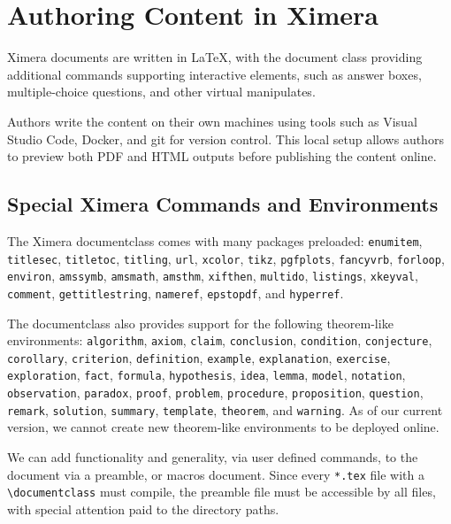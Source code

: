 \documentclass{ltugboat}
\begin{document}
\section{Authoring Content in Ximera}

Ximera documents are written in \LaTeX, with the document class providing
additional commands supporting interactive elements, such as answer boxes,
multiple-choice questions, and other virtual manipulates.

Authors write the content on their own machines using tools such as Visual
Studio Code, Docker, and git for
version control. This local setup allows authors to preview both PDF and HTML
outputs before publishing the content online.

\subsection{Special Ximera Commands and Environments}

The Ximera documentclass comes with many packages preloaded:
\verb!enumitem!,
\verb!titlesec!,
\verb!titletoc!,
\verb!titling!,
\verb!url!,
\verb!xcolor!,
\verb!tikz!,
\verb!pgfplots!,
\verb!fancyvrb!,
\verb!forloop!,
\verb!environ!,
\verb!amssymb!,
\verb!amsmath!,
\verb!amsthm!,
\verb!xifthen!,
\verb!multido!,
\verb!listings!,
\verb!xkeyval!,
\verb!comment!,
\verb!gettitlestring!,
\verb!nameref!,
\verb!epstopdf!, and
\verb!hyperref!.

The documentclass also provides support for the following theorem-like
environments:
\verb!algorithm!, \verb!axiom!, \verb!claim!, \verb!conclusion!,
\verb!condition!, \verb!conjecture!, \verb!corollary!, \verb!criterion!,
\verb!definition!, \verb!example!, \verb!explanation!, \verb!exercise!,
\verb!exploration!,
\verb!fact!, \verb!formula!, \verb!hypothesis!, \verb!idea!, \verb!lemma!,
\verb!model!,
\verb!notation!, \verb!observation!, \verb!paradox!, \verb!proof!,
\verb!problem!,
\verb!procedure!,
\verb!proposition!, \verb!question!, \verb!remark!, \verb!solution!,
\verb!summary!, \verb!template!, \verb!theorem!, and \verb!warning!.
As of our current version, we cannot create new theorem-like environments to be
deployed online.

We can add functionality and generality, via user defined commands, to the
document via a preamble, or macros document. Since every \verb!*.tex! file with
a \verb!\documentclass! must compile, the preamble file must be accessible  by
all files, with special attention paid to the directory paths.
\end{document}
